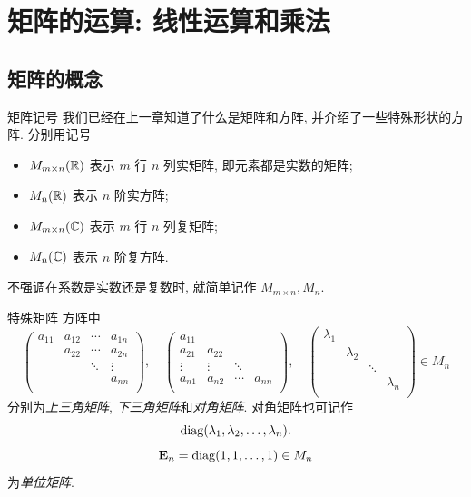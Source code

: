 \section{矩阵的运算: 线性运算和乘法}

\subsection{矩阵的概念}

\begin{frame}{矩阵记号}
	\onslide<+->
	我们已经在上一章知道了什么是矩阵和方阵, 并介绍了一些特殊形状的方阵.
	\onslide<+->
	分别用记号
	\begin{itemize}
		\item $M_{m\times n}({\mathbb{R}})$ 表示 $m$ 行 $n$ 列实矩阵, 即元素都是实数的矩阵;
		\item $M_n({\mathbb{R}})$ 表示 $n$ 阶实方阵;
		\item $M_{m\times n}({\mathbb{C}})$ 表示 $m$ 行 $n$ 列复矩阵;
		\item $M_n({\mathbb{C}})$ 表示 $n$ 阶复方阵.
	\end{itemize}
	\onslide<+->
	不强调在系数是实数还是复数时, 就简单记作 $M_{m\times n},M_n$.
\end{frame}


\begin{frame}{特殊矩阵}
	\onslide<+->
	方阵中
	\[\begin{pmatrix}
		a_{11}&a_{12}&\cdots&a_{1n}\\
		&a_{22}&\cdots&a_{2n}\\
		&&\ddots&\vdots\\
		&&&a_{nn}\\
	\end{pmatrix},\quad\begin{pmatrix}
		a_{11}&&&\\
		a_{21}&a_{22}&&\\
		\vdots&\vdots&\ddots&\\
		a_{n1}&a_{n2}&\cdots&a_{nn}\\
	\end{pmatrix},\quad\begin{pmatrix}
		\lambda_1&&&\\
		&\lambda_2&&\\
		&&\ddots&\\
		&&&\lambda_n\\
	\end{pmatrix}\in M_n\]
	分别为\emph{上三角矩阵}, \emph{下三角矩阵}和\emph{对角矩阵}.
	\onslide<+->
	对角矩阵也可记作
	\[{\mathrm{diag}}(\lambda_1,\lambda_2,\dots,\lambda_n).\]
	\onslide<+->
	\[{\mathbf{E}}_n={\mathrm{diag}}(1,1,\dots,1)\in M_n\]
	为\emph{单位矩阵}.
\end{frame}



